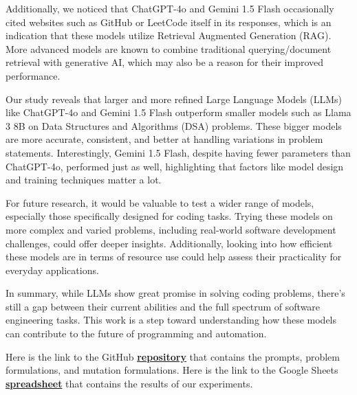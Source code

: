 \documentclass[times, 10pt,twocolumn]{article}
\begin{document}
Additionally, we noticed that ChatGPT-4o and Gemini 1.5 Flash occasionally cited websites such as GitHub or LeetCode itself in its responses, which is an indication that these models utilize Retrieval Augmented Generation (RAG). More advanced models are known to combine traditional querying/document retrieval with generative AI, which may also be a reason for their improved performance.


Our study reveals that larger and more refined Large Language Models (LLMs) like ChatGPT-4o and Gemini 1.5 Flash outperform smaller models such as Llama 3 8B on Data Structures and Algorithms (DSA) problems. These bigger models are more accurate, consistent, and better at handling variations in problem statements. Interestingly, Gemini 1.5 Flash, despite having fewer parameters than ChatGPT-4o, performed just as well, highlighting that factors like model design and training techniques matter a lot.

For future research, it would be valuable to test a wider range of models, especially those specifically designed for coding tasks. Trying these models on more complex and varied problems, including real-world software development challenges, could offer deeper insights. Additionally, looking into how efficient these models are in terms of resource use could help assess their practicality for everyday applications.

In summary, while LLMs show great promise in solving coding problems, there's still a gap between their current abilities and the full spectrum of software engineering tasks. This work is a step toward understanding how these models can contribute to the future of programming and automation.   

Here is the link to the GitHub \textbf{\href{https://github.com/JaykumarPatel4802/software-testing-project}{repository}} that contains the prompts, problem formulations, and mutation formulations. Here is the link to the Google Sheets \textbf{\href{https://docs.google.com/spreadsheets/d/11I5tJY4y23TiVjcQp0gYHosABqDVvtIG0WB7ye1b420/edit?usp=sharing}{spreadsheet}} that contains the results of our experiments.




\pagebreak
\end{document}
